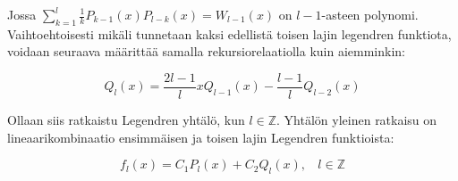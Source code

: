 \documentclass[../johdoksia.tex]{subfiles}
\begin{document}
	Jossa $\sum_{k = 1}^{l}\frac{1}{k}P_{k - 1}(x)P_{l - k}(x) = W_{l - 1}(x)$ on $l - 1$-asteen polynomi. Vaihtoehtoisesti mikäli tunnetaan kaksi edellistä toisen lajin legendren funktiota, voidaan seuraava määrittää samalla rekursiorelaatiolla kuin aiemminkin:
	
	\begin{equation}
		\boxed{Q_l(x) = \frac{2l - 1}{l}xQ_{l - 1}(x) - \frac{l - 1}{l}Q_{l - 2}(x)}
	\end{equation}

	Ollaan siis ratkaistu Legendren yhtälö, kun $l \in \mathbb{Z}$. Yhtälön yleinen ratkaisu on lineaarikombinaatio ensimmäisen ja toisen lajin Legendren funktioista:
	
	\begin{equation}
		\boxed{f_l(x) = C_1P_l(x) + C_2Q_l(x), \ \ \ \ l\in\mathbb{Z}}
	\end{equation}
\end{document}
